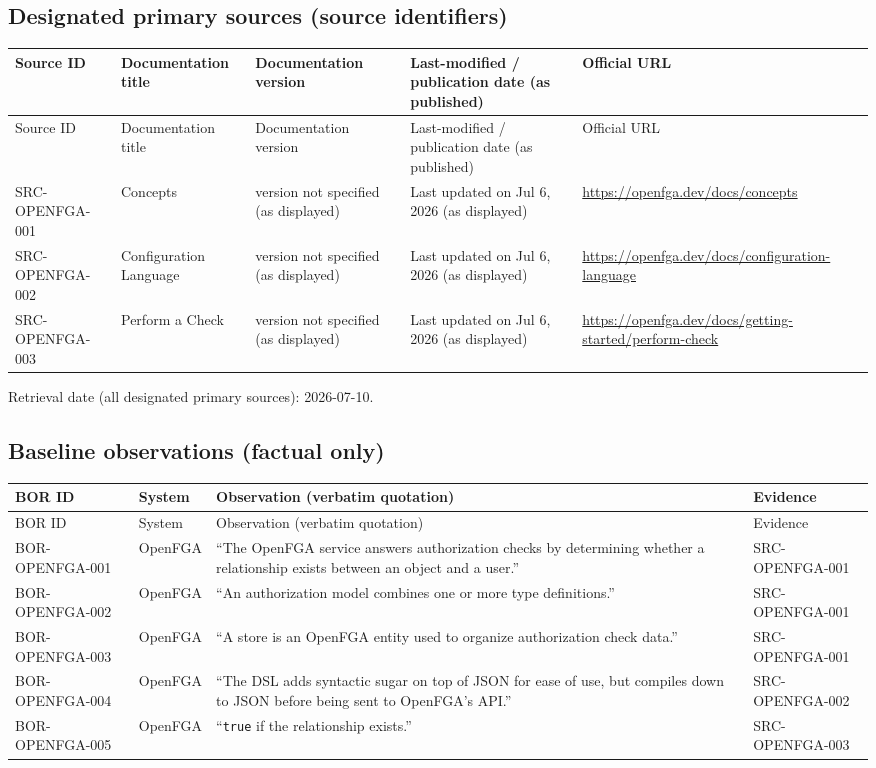 \documentclass{article}
\begin{document}
\subsection*{Designated primary sources (source identifiers)}
\begin{longtable}{@{}p{}p{}p{}p{}p{}@{}}
\toprule
Source ID & Documentation title & Documentation version & Last-modified / publication date (as published) & Official URL\\
\midrule
\endfirsthead
\toprule
Source ID & Documentation title & Documentation version & Last-modified / publication date (as published) & Official URL\\
\midrule
\endhead
SRC-OPENFGA-001 & Concepts & version not specified (as displayed) & Last updated on Jul 6, 2026 (as displayed) & \url{https://openfga.dev/docs/concepts}\\
SRC-OPENFGA-002 & Configuration Language & version not specified (as displayed) & Last updated on Jul 6, 2026 (as displayed) & \url{https://openfga.dev/docs/configuration-language}\\
SRC-OPENFGA-003 & Perform a Check & version not specified (as displayed) & Last updated on Jul 6, 2026 (as displayed) & \url{https://openfga.dev/docs/getting-started/perform-check}\\
\bottomrule
\end{longtable}
Retrieval date (all designated primary sources): 2026-07-10.

\subsection*{Baseline observations (factual only)}
\begin{longtable}{@{}p{}p{}p{}p{}@{}}
\toprule
BOR ID & System & Observation (verbatim quotation) & Evidence\\
\midrule
\endfirsthead
\toprule
BOR ID & System & Observation (verbatim quotation) & Evidence\\
\midrule
\endhead
BOR-OPENFGA-001 & OpenFGA & ``The OpenFGA service answers authorization checks by determining whether a relationship exists between an object and a user.'' & SRC-OPENFGA-001\\
BOR-OPENFGA-002 & OpenFGA & ``An authorization model combines one or more type definitions.'' & SRC-OPENFGA-001\\
BOR-OPENFGA-003 & OpenFGA & ``A store is an OpenFGA entity used to organize authorization check data.'' & SRC-OPENFGA-001\\
BOR-OPENFGA-004 & OpenFGA & ``The DSL adds syntactic sugar on top of JSON for ease of use, but compiles down to JSON before being sent to OpenFGA's API.'' & SRC-OPENFGA-002\\
BOR-OPENFGA-005 & OpenFGA & ``\texttt{true} if the relationship exists.'' & SRC-OPENFGA-003\\
\bottomrule
\end{longtable}
\end{document}
